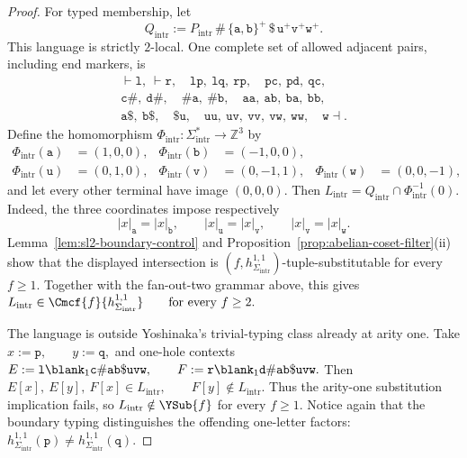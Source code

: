 \begin{proof}
For typed membership, let
\[
 Q_{\mathrm{intr}}
 :=P_{\mathrm{intr}}\,\mathtt{\#}\,\{\mathtt a,\mathtt b\}^+\,
   \mathtt{\$}\,\mathtt u^+\mathtt v^+\mathtt w^+ .
\]
This language is strictly $2$-local.  One complete set of allowed adjacent
pairs, including end markers, is
\[
\begin{gathered}
 \vdash\mathtt l,\ \vdash\mathtt r,\quad
 \mathtt{lp},\ \mathtt{lq},\ \mathtt{rp},\quad
 \mathtt{pc},\ \mathtt{pd},\ \mathtt{qc},\\
 \mathtt{c\#},\ \mathtt{d\#},\quad
 \mathtt{\#a},\ \mathtt{\#b},\quad
 \mathtt{aa},\ \mathtt{ab},\ \mathtt{ba},\ \mathtt{bb},\\
 \mathtt{a\$},\ \mathtt{b\$},\quad
 \mathtt{\$u},\quad
 \mathtt{uu},\ \mathtt{uv},\ \mathtt{vv},\ \mathtt{vw},\
 \mathtt{ww},\quad
 \mathtt w\dashv .
\end{gathered}
\]
Define the homomorphism
\(\Phi_{\mathrm{intr}}:\Sigma_{\mathrm{intr}}^*\to\mathbb Z^3\)
by
\[
\begin{aligned}
 \Phi_{\mathrm{intr}}(\mathtt a)&=(1,0,0),&
 \Phi_{\mathrm{intr}}(\mathtt b)&=(-1,0,0),\\
 \Phi_{\mathrm{intr}}(\mathtt u)&=(0,1,0),&
 \Phi_{\mathrm{intr}}(\mathtt v)&=(0,-1,1),&
 \Phi_{\mathrm{intr}}(\mathtt w)&=(0,0,-1),
\end{aligned}
\]
and let every other terminal have image $(0,0,0)$.  Then
\(L_{\mathrm{intr}} =Q_{\mathrm{intr}}\cap\Phi_{\mathrm{intr}}^{-1}(0).\)
Indeed, the three coordinates impose respectively
\[
 |x|_{\mathtt a}=|x|_{\mathtt b},\qquad
 |x|_{\mathtt u}=|x|_{\mathtt v},\qquad
 |x|_{\mathtt v}=|x|_{\mathtt w}.
\]
Lemma~\ref{lem:sl2-boundary-control} and
Proposition~\ref{prop:abelian-coset-filter}(ii) show that the displayed
intersection is $(f,h_{\Sigma_{\mathrm{intr}}}^{1,1})$-tuple-substitutable
for every $f\ge1$.  Together with the fan-out-two grammar above, this gives
\(L_{\mathrm{intr}} \in\Cmcf{f}{h_{\Sigma_{\mathrm{intr}}}^{1,1}} \qquad\text{for every }f\ge2.\)

The language is outside Yoshinaka's trivial-typing class already at arity one.
Take
\(x:=\mathtt p,\qquad y:=\mathtt q,\)
and one-hole contexts
\(E:=\mathtt l\blank_1\mathtt{c\#ab\$uvw}, \qquad F:=\mathtt r\blank_1\mathtt{d\#ab\$uvw}.\)
Then
\(E[x],\ E[y],\ F[x]\in L_{\mathrm{intr}}, \qquad F[y]\notin L_{\mathrm{intr}}.\)
Thus the arity-one substitution implication fails, so
$L_{\mathrm{intr}}\notin\YSub{f}$ for every $f\ge1$.  Notice again that the
boundary typing distinguishes the offending one-letter factors:
\(h_{\Sigma_{\mathrm{intr}}}^{1,1}(\mathtt p) \ne h_{\Sigma_{\mathrm{intr}}}^{1,1}(\mathtt q).\)


\end{proof}
